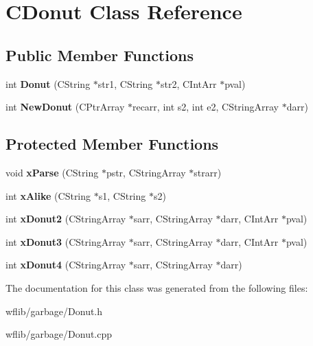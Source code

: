 \hypertarget{class_c_donut}{\section{C\-Donut Class Reference}
\label{class_c_donut}
}
\subsection*{Public Member Functions}
\begin{DoxyCompactItemize}
\item 
\hypertarget{class_c_donut_a50e9cdb213268d2df0e481332c5766eb}{int {\bfseries Donut} (C\-String $\ast$str1, C\-String $\ast$str2, C\-Int\-Arr $\ast$pval)}\label{class_c_donut_a50e9cdb213268d2df0e481332c5766eb}

\item 
\hypertarget{class_c_donut_abab354aedee1cd650d542f8ecf5d31aa}{int {\bfseries New\-Donut} (C\-Ptr\-Array $\ast$recarr, int s2, int e2, C\-String\-Array $\ast$darr)}\label{class_c_donut_abab354aedee1cd650d542f8ecf5d31aa}

\end{DoxyCompactItemize}
\subsection*{Protected Member Functions}
\begin{DoxyCompactItemize}
\item 
\hypertarget{class_c_donut_aeaf546f7edfc8829b54afe9405ff8209}{void {\bfseries x\-Parse} (C\-String $\ast$pstr, C\-String\-Array $\ast$strarr)}\label{class_c_donut_aeaf546f7edfc8829b54afe9405ff8209}

\item 
\hypertarget{class_c_donut_a355246791a5a5d84356aa9cdb2d6c048}{int {\bfseries x\-Alike} (C\-String $\ast$s1, C\-String $\ast$s2)}\label{class_c_donut_a355246791a5a5d84356aa9cdb2d6c048}

\item 
\hypertarget{class_c_donut_a99d6af0483084cb2255909b31931ef26}{int {\bfseries x\-Donut2} (C\-String\-Array $\ast$sarr, C\-String\-Array $\ast$darr, C\-Int\-Arr $\ast$pval)}\label{class_c_donut_a99d6af0483084cb2255909b31931ef26}

\item 
\hypertarget{class_c_donut_a98b9503af5753297a581cfc4df96f5bd}{int {\bfseries x\-Donut3} (C\-String\-Array $\ast$sarr, C\-String\-Array $\ast$darr, C\-Int\-Arr $\ast$pval)}\label{class_c_donut_a98b9503af5753297a581cfc4df96f5bd}

\item 
\hypertarget{class_c_donut_a761d9a094e1a0c49fa4a697b2ed74fb2}{int {\bfseries x\-Donut4} (C\-String\-Array $\ast$sarr, C\-String\-Array $\ast$darr)}\label{class_c_donut_a761d9a094e1a0c49fa4a697b2ed74fb2}

\end{DoxyCompactItemize}


The documentation for this class was generated from the following files\-:\begin{DoxyCompactItemize}
\item 
wflib/garbage/Donut.\-h\item 
wflib/garbage/Donut.\-cpp\end{DoxyCompactItemize}
